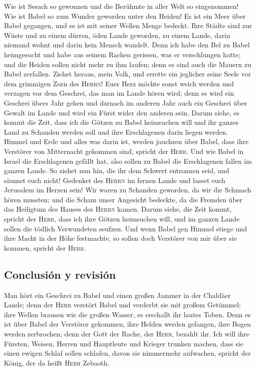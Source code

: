  Wie ist Sesach so gewonnen und die Berühmte in aller
Welt so eingenommen! Wie ist Babel so zum Wunder geworden unter den
Heiden!  Es ist ein Meer über Babel gegangen, und es ist
mit seiner Wellen Menge bedeckt.  Ihre Städte sind zur
Wüste und zu einem dürren, öden Lande geworden, zu einem Lande, darin
niemand wohnt und darin kein Mensch wandelt.  Denn ich
habe den Bel zu Babel heimgesucht und habe aus seinem Rachen gerissen,
was er verschlungen hatte; und die Heiden sollen nicht mehr zu ihm
laufen; denn es sind auch die Mauern zu Babel zerfallen. 
Ziehet heraus, mein Volk, und errette ein jeglicher seine Seele vor dem
grimmigen Zorn des \textsc{Herrn}!  Euer Herz möchte
sonst weich werden und verzagen vor dem Geschrei, das man im Lande hören
wird; denn es wird ein Geschrei übers Jahr gehen und darnach im anderen
Jahr auch ein Geschrei über Gewalt im Lande und wird ein Fürst wider den
anderen sein.  Darum siehe, es kommt die Zeit, dass ich
die Götzen zu Babel heimsuchen will und ihr ganzes Land zu Schanden
werden soll und ihre Erschlagenen darin liegen werden. 
Himmel und Erde und alles was darin ist, werden jauchzen über Babel,
dass ihre Verstörer von Mitternacht gekommen sind, spricht der
\textsc{Herr}.  Und wie Babel in Israel die Erschlagenen
gefällt hat, also sollen zu Babel die Erschlagenen fallen im ganzen
Lande.  So ziehet nun hin, die ihr dem Schwert entronnen
seid, und säumet euch nicht! Gedenket des \textsc{Herrn} im fernen Lande
und lasset euch Jerusalem im Herzen sein!  Wir waren zu
Schanden geworden, da wir die Schmach hören mussten; und die Scham unser
Angesicht bedeckte, da die Fremden über das Heiligtum des Hauses des
\textsc{Herrn} kamen.  Darum siehe, die Zeit kommt,
spricht der \textsc{Herr}, dass ich ihre Götzen heimsuchen will, und im
ganzen Lande sollen die tödlich Verwundeten seufzen.  Und
wenn Babel gen Himmel stiege und ihre Macht in der Höhe festmachte, so
sollen doch Verstörer von mir über sie kommen, spricht der
\textsc{Herr}.

\hypertarget{conclusiuxf3n-y-revisiuxf3n}{%
\subsection{Conclusión y revisión}\label{conclusiuxf3n-y-revisiuxf3n}}

 Man hört ein Geschrei zu Babel und einen großen Jammer
in der Chaldäer Lande;  denn der \textsc{Herr} verstört
Babel und verderbt sie mit großem Getümmel; ihre Wellen brausen wie die
großen Wasser, es erschallt ihr lautes Toben.  Denn es
ist über Babel der Verstörer gekommen, ihre Helden werden gefangen, ihre
Bogen werden zerbrochen; denn der Gott der Rache, der \textsc{Herr},
bezahlt ihr.  Ich will ihre Fürsten, Weisen, Herren und
Hauptleute und Krieger trunken machen, dass sie einen ewigen Schlaf
sollen schlafen, davon sie nimmermehr aufwachen, spricht der König, der
da heißt \textsc{Herr} Zebaoth.

